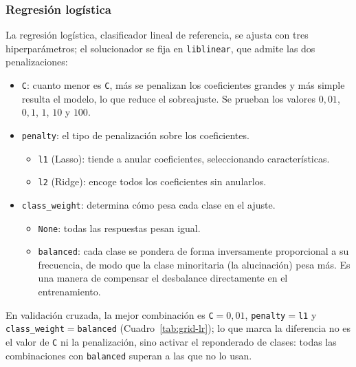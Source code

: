 \documentclass[12pt,a4paper]{report}
\theoremstyle{definition}
\newcommand{\tc}[1]{\texttt{#1}}
\begin{document}
\newcommand{\rocw}{0.42\textwidth}

\subsubsection{Regresión logística}

La regresión logística, clasificador lineal de referencia, se ajusta con tres hiperparámetros; el
solucionador se fija en \tc{liblinear}, que admite las dos penalizaciones:

\begin{itemize}
\item \tc{C}: cuanto menor es \tc{C}, más se
penalizan los coeficientes grandes y más simple resulta el modelo, lo que reduce el
sobreajuste. Se prueban los valores $0{,}01$, $0{,}1$, $1$, $10$ y $100$.
\item \tc{penalty}: el tipo de penalización sobre los coeficientes.
  \begin{itemize}
  \item \tc{l1} (Lasso): tiende a anular coeficientes, seleccionando características.
  \item \tc{l2} (Ridge): encoge todos los coeficientes sin anularlos.
  \end{itemize}
\item \tc{class\_weight}: determina cómo pesa cada clase en el ajuste.
  \begin{itemize}
  \item \tc{None}: todas las respuestas pesan igual.
  \item \tc{balanced}: cada clase se pondera de forma inversamente proporcional a su
  frecuencia, de modo que la clase minoritaria (la alucinación) pesa más. Es una manera de
  compensar el desbalance directamente en el entrenamiento.
  \end{itemize}
\end{itemize}

En validación cruzada, la mejor combinación es \tc{C}${}=0{,}01$, \tc{penalty}${}=$\tc{l1} y \tc{class\_weight}${}=$\tc{balanced} (Cuadro~\ref{tab:grid-lr}); lo que marca la diferencia no es el valor de \tc{C} ni la penalización, sino activar el reponderado de clases: todas las combinaciones con \tc{balanced} superan a las que no lo usan.
\end{document}
